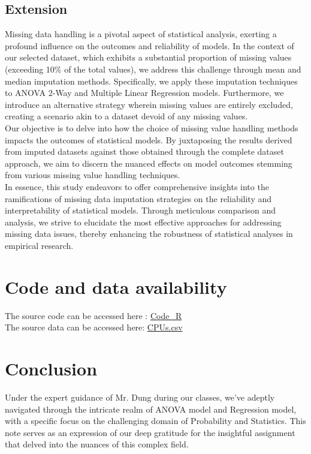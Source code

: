 \documentclass[a4paper]{article}
\begin{document}
	\subsection{Extension}
	Missing data handling is a pivotal aspect of statistical analysis, exerting a profound influence on the outcomes and reliability of models. In the context of our selected dataset, which exhibits a substantial proportion of missing values (exceeding 10\% of the total values), we address this challenge through mean and median imputation methods. Specifically, we apply these imputation techniques to ANOVA 2-Way and Multiple Linear Regression models. Furthermore, we introduce an alternative strategy wherein missing values are entirely excluded, creating a scenario akin to a dataset devoid of any missing values.\\
	Our objective is to delve into how the choice of missing value handling methods impacts the outcomes of statistical models. By juxtaposing the results derived from imputed datasets against those obtained through the complete dataset approach, we aim to discern the nuanced effects on model outcomes stemming from various missing value handling techniques.\\
	In essence, this study endeavors to offer comprehensive insights into the ramifications of missing data imputation strategies on the reliability and interpretability of statistical models. Through meticulous comparison and analysis, we strive to elucidate the most effective approaches for addressing missing data issues, thereby enhancing the robustness of statistical analyses in empirical research.
	\section{Code and data availability}
	The source code can be accessed here : \href{https://drive.google.com/file/d/1Il4iC7faB02F3UE7uU0fYfBMuZrJhS0D/view?usp=sharing}{Code\_R}
	\\The source data can be accessed here: \href{https://drive.google.com/file/d/1i2Abu2gYUc_WXi9VG8lIduRie_3jNC4r/view?usp=sharing}{CPUs.csv}
	
	\section{Conclusion}
	\hspace{1.5em}Under the expert guidance of Mr. Dung during our classes, we've adeptly navigated through the intricate realm of ANOVA model and Regression model, with a specific focus on the challenging domain of Probability and Statistics. This note serves as an expression of our deep gratitude for the insightful assignment that delved into the nuances of this complex field.
	
\end{document}
